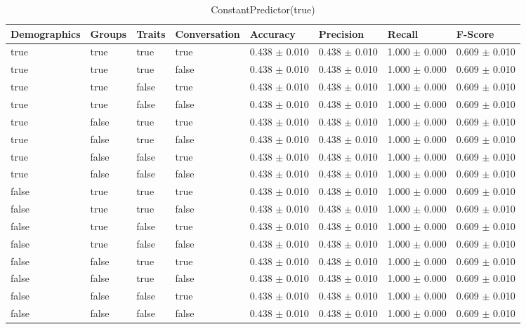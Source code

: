 \begin{table}[h]
	\centering
	\begin{tabular}{|l|l|l|l|l|l|l|l|} %
	\hline
	Demographics & Groups & Traits & Conversation & Accuracy & Precision & Recall & F-Score \\ \hline
	true & true & true & true & 0.438	\( \pm \) 0.010	& 0.438	\( \pm \) 0.010	& 1.000	\( \pm \) 0.000	& 0.609	\( \pm \) 0.010	\\ \hline
	true & true & true & false & 0.438	\( \pm \) 0.010	& 0.438	\( \pm \) 0.010	& 1.000	\( \pm \) 0.000	& 0.609	\( \pm \) 0.010	\\ \hline
	true & true & false & true & 0.438	\( \pm \) 0.010	& 0.438	\( \pm \) 0.010	& 1.000	\( \pm \) 0.000	& 0.609	\( \pm \) 0.010	\\ \hline
	true & true & false & false & 0.438	\( \pm \) 0.010	& 0.438	\( \pm \) 0.010	& 1.000	\( \pm \) 0.000	& 0.609	\( \pm \) 0.010	\\ \hline
	true & false & true & true & 0.438	\( \pm \) 0.010	& 0.438	\( \pm \) 0.010	& 1.000	\( \pm \) 0.000	& 0.609	\( \pm \) 0.010	\\ \hline
	true & false & true & false & 0.438	\( \pm \) 0.010	& 0.438	\( \pm \) 0.010	& 1.000	\( \pm \) 0.000	& 0.609	\( \pm \) 0.010	\\ \hline
	true & false & false & true & 0.438	\( \pm \) 0.010	& 0.438	\( \pm \) 0.010	& 1.000	\( \pm \) 0.000	& 0.609	\( \pm \) 0.010	\\ \hline
	true & false & false & false & 0.438	\( \pm \) 0.010	& 0.438	\( \pm \) 0.010	& 1.000	\( \pm \) 0.000	& 0.609	\( \pm \) 0.010	\\ \hline
	false & true & true & true & 0.438	\( \pm \) 0.010	& 0.438	\( \pm \) 0.010	& 1.000	\( \pm \) 0.000	& 0.609	\( \pm \) 0.010	\\ \hline
	false & true & true & false & 0.438	\( \pm \) 0.010	& 0.438	\( \pm \) 0.010	& 1.000	\( \pm \) 0.000	& 0.609	\( \pm \) 0.010	\\ \hline
	false & true & false & true & 0.438	\( \pm \) 0.010	& 0.438	\( \pm \) 0.010	& 1.000	\( \pm \) 0.000	& 0.609	\( \pm \) 0.010	\\ \hline
	false & true & false & false & 0.438	\( \pm \) 0.010	& 0.438	\( \pm \) 0.010	& 1.000	\( \pm \) 0.000	& 0.609	\( \pm \) 0.010	\\ \hline
	false & false & true & true & 0.438	\( \pm \) 0.010	& 0.438	\( \pm \) 0.010	& 1.000	\( \pm \) 0.000	& 0.609	\( \pm \) 0.010	\\ \hline
	false & false & true & false & 0.438	\( \pm \) 0.010	& 0.438	\( \pm \) 0.010	& 1.000	\( \pm \) 0.000	& 0.609	\( \pm \) 0.010	\\ \hline
	false & false & false & true & 0.438	\( \pm \) 0.010	& 0.438	\( \pm \) 0.010	& 1.000	\( \pm \) 0.000	& 0.609	\( \pm \) 0.010	\\ \hline
	false & false & false & false & 0.438	\( \pm \) 0.010	& 0.438	\( \pm \) 0.010	& 1.000	\( \pm \) 0.000	& 0.609	\( \pm \) 0.010	\\ \hline
	\end{tabular}
	\caption{ConstantPredictor(true)}
	\label{tab:revpol}
\end{table}
